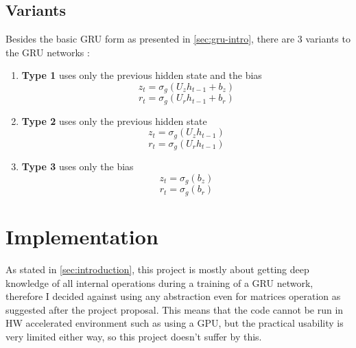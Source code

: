 \documentclass[11pt]{article}
\newcommand{\todo}[1]{{\color{red}\textbf{[[TODO: #1]]}}}
\begin{document}
		\subsection{Variants}
			Besides the basic GRU form as presented in \ref{sec:gru-intro}, there are 3 variants to the GRU networks \cite{dey2017gatevariants}:
			\begin{enumerate}
				\item \textbf{Type 1} uses only the previous hidden state and the bias
					\begin{equation}
						z_t = \sigma_g(U_{z} h_{t-1} + b_z)
					\end{equation}
					\begin{equation}
						r_t = \sigma_g(U_{r} h_{t-1} + b_r) 
					\end{equation}
				
				\item \textbf{Type 2} uses only the previous hidden state
					\begin{equation}
						z_t = \sigma_g(U_{z} h_{t-1})
					\end{equation}
					\begin{equation}
						r_t = \sigma_g(U_{r} h_{t-1}) 
					\end{equation}
				
				\item \textbf{Type 3} uses only the bias
					\begin{equation}
						z_t = \sigma_g(b_z)
					\end{equation}
					\begin{equation}
						r_t = \sigma_g(b_r) 
					\end{equation}
			\end{enumerate}
		

	\section{Implementation} \label{sec:implementation}
		As stated in \ref{sec:introduction}, this project is mostly about getting deep knowledge of all internal operations during a training of a GRU network, therefore I decided against using any abstraction even for matrices operation as suggested after the project proposal. This means that the code cannot be run in HW accelerated environment such as using a GPU, but the practical usability is very limited either way, so this project doesn't suffer by this.
		
\end{document}
